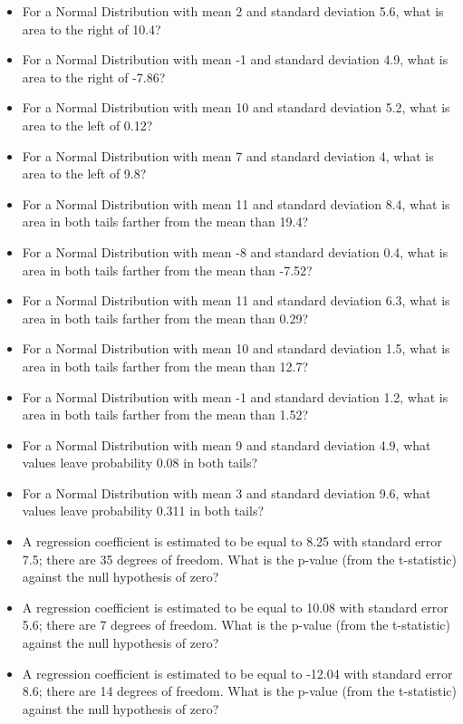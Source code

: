 \documentclass[]{article}
\providecommand{\tightlist}{%
  \setlength{\itemsep}{0pt}\setlength{\parskip}{0pt}}
\begin{document}
\begin{itemize}
\tightlist
\item
  For a Normal Distribution with mean 2 and standard deviation 5.6, what
  is area to the right of 10.4?
\item
  For a Normal Distribution with mean -1 and standard deviation 4.9,
  what is area to the right of -7.86?
\item
  For a Normal Distribution with mean 10 and standard deviation 5.2,
  what is area to the left of 0.12?
\item
  For a Normal Distribution with mean 7 and standard deviation 4, what
  is area to the left of 9.8?
\item
  For a Normal Distribution with mean 11 and standard deviation 8.4,
  what is area in both tails farther from the mean than 19.4?
\item
  For a Normal Distribution with mean -8 and standard deviation 0.4,
  what is area in both tails farther from the mean than -7.52?
\item
  For a Normal Distribution with mean 11 and standard deviation 6.3,
  what is area in both tails farther from the mean than 0.29?
\item
  For a Normal Distribution with mean 10 and standard deviation 1.5,
  what is area in both tails farther from the mean than 12.7?
\item
  For a Normal Distribution with mean -1 and standard deviation 1.2,
  what is area in both tails farther from the mean than 1.52?
\item
  For a Normal Distribution with mean 9 and standard deviation 4.9, what
  values leave probability 0.08 in both tails?
\item
  For a Normal Distribution with mean 3 and standard deviation 9.6, what
  values leave probability 0.311 in both tails?
\item
  A regression coefficient is estimated to be equal to 8.25 with
  standard error 7.5; there are 35 degrees of freedom. What is the
  p-value (from the t-statistic) against the null hypothesis of zero?
\item
  A regression coefficient is estimated to be equal to 10.08 with
  standard error 5.6; there are 7 degrees of freedom. What is the
  p-value (from the t-statistic) against the null hypothesis of zero?
\item
  A regression coefficient is estimated to be equal to -12.04 with
  standard error 8.6; there are 14 degrees of freedom. What is the
  p-value (from the t-statistic) against the null hypothesis of zero?
\end{itemize}
\end{document}
